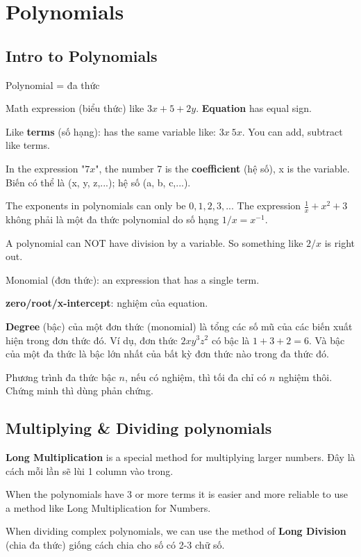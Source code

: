 \chapter{Polynomials}

\section{Intro to Polynomials}

Polynomial = đa thức

Math expression (biểu thức) like \(3x + 5 + 2y\). \textbf{Equation} has equal sign.

Like \textbf{terms} (số hạng): has the same variable like: \(3x\ 5x\). You can add, subtract like terms.

In the expression "\(7x\)", the number 7 is the \textbf{coefficient} (hệ số), x is the variable. Biến có thể là (x, y, z,...); hệ số (a, b, c,...).

The exponents in polynomials can only be $0,1,2,3,...$ The expression $\frac{1}{x} + x^{2} + 3$ không phải là một đa thức polynomial do số hạng $1/x=x^{-1}$.

A polynomial can NOT have division by a variable. So something like $2/x$ is right out.

Monomial (đơn thức): an expression that has a single term.

\textbf{zero/root/x-intercept}: nghiệm của equation.

\textbf{Degree} (bậc) của một đơn thức (monomial) là tổng các số mũ của các biến xuất hiện trong đơn thức đó. Ví dụ, đơn thức $2xy^{3}z^{2}$ có bậc là $1+3+2=6$. Và bậc của một đa thức là bậc lớn nhất của bất kỳ đơn thức nào trong đa thức đó.

Phương trình đa thức bậc $n$, nếu có nghiệm, thì tối đa chỉ có $n$ nghiệm thôi. Chứng minh thì dùng phản chứng.

\section{Multiplying \& Dividing polynomials}

\textbf{Long Multiplication} is a special method for multiplying larger numbers. Đây là cách  mỗi lần sẽ lùi 1 column vào trong.

When the polynomials have 3 or more terms it is easier and more reliable to use a method like Long Multiplication for Numbers.

When dividing complex polynomials, we can use the method of \textbf{Long Division} (chia đa thức) giống cách chia cho số có 2-3 chữ số.

